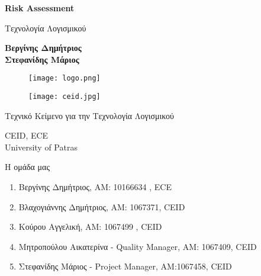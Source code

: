 \documentclass{article}
\begin{document}
\begin{titlepage}
   \begin{center}
       \vspace*{1cm}

       \textbf{\huge Risk Assessment}

       \vspace{0.5cm}
        Τεχνολογία Λογισμικού
            
       \vspace{1cm}

       \textbf{Βεργίνης Δημήτριος\\Στεφανίδης Μάριος}
       
       \begin{figure}[!htb]
        \centering
        \texttt{[image: logo.png]}
        \end{figure}
        
        \vspace{0.5cm}
        
        \begin{figure}[!htb]
        \centering
        \texttt{[image: ceid.jpg]}
        \end{figure}


       \vfill
            
       Τεχνικό Κείμενο για την Τεχνολογία Λογισμικού\\
            
       \vspace{0.5cm}
            
       CEID, ECE\\
       University of Patras\\
            
   \end{center}
\end{titlepage}

\noindent Η ομάδα μας

\begin{enumerate}
  \item Βεργίνης Δημήτριος, ΑΜ: 10166634 , ECE
  \item Βλαχογιάννης Δημήτριος, ΑΜ: 1067371, CEID
  \item Κούρου Αγγελική, ΑΜ: 1067499 , CEID
  \item Μητροπούλου Αικατερίνα - Quality Manager, ΑΜ: 1067409, CEID
  \item Στεφανίδης Μάριος - Project Manager, ΑΜ:1067458, CEID
\end{enumerate}
{
  \hypersetup{linkcolor=black}
  \tableofcontents
}
\end{document}
